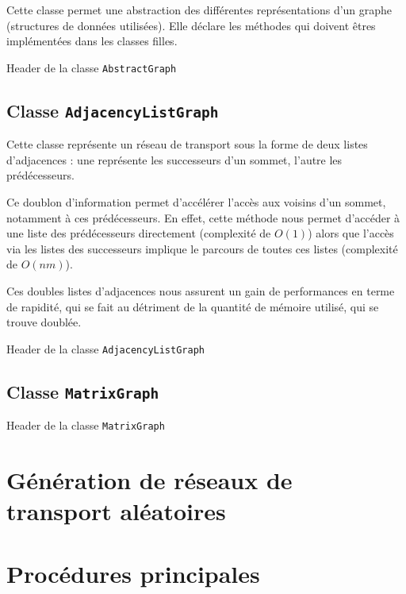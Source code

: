 Cette classe permet une abstraction des différentes représentations d'un graphe (structures de données utilisées). Elle déclare les méthodes qui doivent êtres implémentées dans les classes filles.

Header de la classe \texttt{AbstractGraph}



\subsection{Classe \texttt{AdjacencyListGraph}}
Cette classe représente un réseau de transport sous la forme
de deux listes d'adjacences : une représente les 
successeurs d'un sommet, l'autre les prédécesseurs.

Ce doublon d'information permet d'accélérer l'accès aux voisins d'un sommet, notamment à ces prédécesseurs. En effet, cette méthode nous permet d'accéder à une liste des prédécesseurs directement (complexité de $O(1)$) alors que l'accès via les listes des successeurs implique le parcours de toutes ces listes (complexité de $O(nm)$).

Ces doubles listes d'adjacences nous assurent un gain de performances en terme de rapidité, qui se fait au détriment de la quantité de mémoire utilisé, qui se trouve doublée.

Header de la classe \texttt{AdjacencyListGraph}




\subsection{Classe \texttt{MatrixGraph}}

Header de la classe \texttt{MatrixGraph}



\section{Génération de réseaux de transport aléatoires}



\section{Procédures principales}

